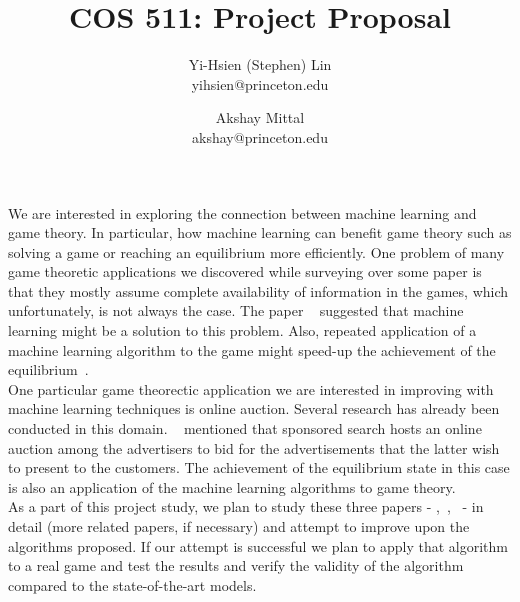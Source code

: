 \documentclass[12pt]{article}
\begin{document}
\title{COS 511: Project Proposal}
\author{
  Yi-Hsien (Stephen) Lin\\ yihsien@princeton.edu
  \and
  Akshay Mittal \\ akshay@princeton.edu
}
\date{}

\maketitle

\noindent We are interested in exploring the connection between machine
 learning and game theory. In particular, how machine learning can benefit game
 theory such as solving a game or reaching an equilibrium more efficiently. One
 problem of many game theoretic applications we discovered while surveying over
 some paper is that they mostly assume complete
 availability of information in the games, which unfortunately, is not always
 the case. The paper ~\cite{Blum:2006} suggested that machine learning might be
 a solution to this problem. Also, repeated application of a machine learning
 algorithm to the game might speed-up the achievement of the
 equilibrium~\cite{Freund:1996}.\\

\noindent One particular game theorectic application we are interested in
improving with machine learning techniques is online auction. Several research
 has already been conducted in this domain. ~\cite{He:2013} mentioned that
 sponsored search
 hosts an online auction among the advertisers to bid for the advertisements
 that the latter wish to present to the customers. The achievement of the
 equilibrium state in this case is also an application of the machine learning
 algorithms to game theory.\\

\noindent As a part of this project study, we plan to study these three papers -
\cite{Freund:1996},~\cite{Blum:2006},~\cite{He:2013} - in detail (more related
 papers, if necessary) and attempt to improve upon the algorithms proposed. If
 our attempt is successful we plan to apply that algorithm to a real game and
 test the results and verify the validity of the algorithm compared to the
 state-of-the-art models.


{\footnotesize


}
\end{document}
